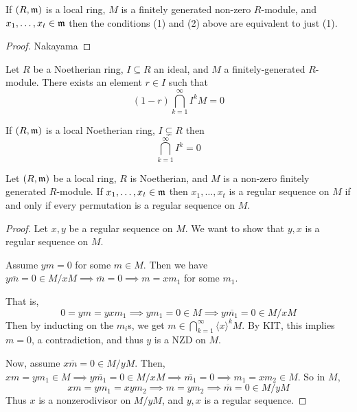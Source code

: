 \documentclass[12pt]{amsart}
\begin{document}
\begin{lemma}
    If $(R, \operatorname{\mathfrak{m}})$ is a local ring, $M$ is a finitely generated non-zero $R$-module, and $x_1, \ldots, x_t \in \operatorname{\mathfrak{m}}$ then the conditions (1) and (2) above are equivalent to just (1). 
\end{lemma}

\begin{proof}
    Nakayama
\end{proof}


\begin{theorem}
    Let $R$ be a Noetherian ring, $I \subseteq R$ an ideal, and $M$ a finitely-generated $R$-module. There exists an element $r \in I$ such that \[(1-r) \bigcap_{k=1}^\infty I^kM = 0\]
\end{theorem}

\begin{corollary}
    If $(R, \operatorname{\mathfrak{m}})$ is a local Noetherian ring, $I \subsetneq R$ then 
    \[\bigcap_{k=1}^\infty I^k = 0\]
\end{corollary}


\begin{theorem}
    Let $(R, \operatorname{\mathfrak{m}})$ be a local ring, $R$ is Noetherian, and $M$ is a non-zero finitely generated $R$-module. If $x_1, \ldots, x_t \in \operatorname{\mathfrak{m}}$ then $x_1, \ldots, x_t$ is a regular sequence on $M$ if and only if every permutation is a regular sequence on $M$. 
\end{theorem}

\begin{proof}
    Let $x, y$ be a regular sequence on $M$. We want to show that $y, x$ is a regular sequence on $M$.  

    Assume $ym = 0$ for some $m \in M$. Then we have $y \overline{m} = 0 \in M/xM \implies \overline{m} =0 \implies m = xm_1$ for some $m_1$. 

    That is, 
    \[0 = ym = yxm_1 \implies ym_1 = 0 \in M \implies y \overline{m_1} = 0 \in M/xM\]
    Then by inducting on the $m_i$s, we get $m \in \bigcap_{k=1}^\infty \langle x \rangle^k M$. By KIT, this implies $m = 0$, a contradiction, and thus $y$ is a NZD on $M$. 
    
    Now, assume $x\overline{m} = 0 \in M/yM$. Then, $xm  = ym_1 \in M \implies y \overline{m_1} = 0 \in M/xM \implies \overline{m_1} = 0 \implies m_1 = xm_2 \in M$. So in $M$, 
    \[xm = ym_1 = xym_2 \implies m = ym_2 \implies \overline{m} = 0 \in M/yM\] 
    Thus $x$ is a nonzerodivisor on $M/yM$, and $y, x$ is a regular sequence. 
\end{proof}
\end{document}
